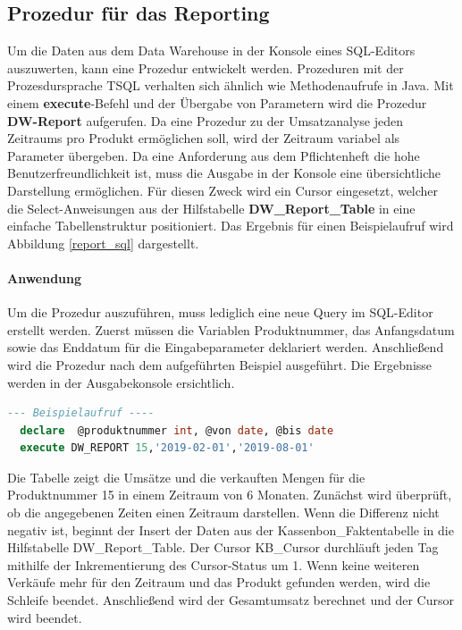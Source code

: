 \subsection{Prozedur für das Reporting}
Um die Daten aus dem Data Warehouse in der Konsole eines SQL-Editors auszuwerten, kann eine Prozedur entwickelt werden. Prozeduren mit der Prozesdursprache TSQL verhalten sich ähnlich wie Methodenaufrufe in Java. Mit einem \textbf{execute}-Befehl und der Übergabe von Parametern wird die Prozedur \textbf{DW-Report} aufgerufen. Da eine Prozedur zu der Umsatzanalyse jeden Zeitraums pro Produkt ermöglichen soll, wird der Zeitraum variabel als Parameter übergeben. Da eine Anforderung aus dem Pflichtenheft die hohe Benutzerfreundlichkeit ist, muss die Ausgabe in der Konsole eine übersichtliche Darstellung ermöglichen. Für diesen Zweck wird ein Cursor eingesetzt, welcher die Select-Anweisungen aus der Hilfstabelle \textbf{DW\_Report\_Table} in eine einfache Tabellenstruktur positioniert. Das Ergebnis für einen Beispielaufruf wird Abbildung \ref{report_sql} dargestellt.

\paragraph{Anwendung}
Um die Prozedur auszuführen, muss lediglich eine neue Query im SQL-Editor erstellt werden. Zuerst müssen die Variablen Produktnummer, das Anfangsdatum sowie das Enddatum für die Eingabeparameter deklariert werden. Anschließend wird die Prozedur nach dem aufgeführten Beispiel ausgeführt. Die Ergebnisse werden in der Ausgabekonsole ersichtlich.

\begin{lstlisting}[language=SQL]
  --- Beispielaufruf ----
  declare  @produktnummer int, @von date, @bis date
  execute DW_REPORT 15,'2019-02-01','2019-08-01'
\end{lstlisting}

Die Tabelle zeigt die Umsätze und die verkauften Mengen für die Produktnummer 15 in einem Zeitraum von 6 Monaten. Zunächst wird überprüft, ob die angegebenen Zeiten einen Zeitraum darstellen. Wenn die Differenz nicht negativ ist, beginnt der Insert der Daten aus der Kassenbon\_Faktentabelle in die Hilfstabelle DW\_Report\_Table. Der Cursor KB\_Cursor durchläuft jeden Tag mithilfe der Inkrementierung des Cursor-Status um 1. Wenn keine weiteren Verkäufe mehr für den Zeitraum und das Produkt gefunden werden, wird die Schleife beendet. Anschließend wird der Gesamtumsatz berechnet und der Cursor wird beendet.

